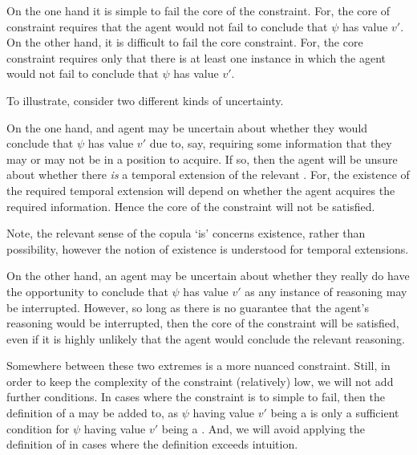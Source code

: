 \begin{note}[Delicacy]
  On the one hand it is simple to fail the core of the constraint.
  For, the core of constraint requires that the agent would not fail to conclude that \(\psi\) has value \(v'\).
  On the other hand, it is difficult to fail the core constraint.
  For, the core constraint requires only that there is at least one instance in which the agent would not fail to conclude that \(\psi\) has value \(v'\).

  To illustrate, consider two different kinds of uncertainty.

  On the one hand, and agent may be uncertain about whether they would conclude that \(\psi\) has value \(v'\) due to, say, requiring some information that they may or may not be in a position to acquire.
  If so, then the agent will be unsure about whether there \emph{is} a temporal extension of the relevant \world{}.
  For, the existence of the required temporal extension will depend on whether the agent acquires the required information.
  Hence the core of the constraint will not be satisfied.

  Note, the relevant sense of the copula `is' concerns existence, rather than possibility, however the notion of existence is understood for temporal extensions.

  On the other hand, an agent may be uncertain about whether they really do have the opportunity to conclude that \(\psi\) has value \(v'\) as any instance of reasoning may be interrupted.
  However, so long as there is no guarantee that the agent's reasoning would be interrupted, then the core of the constraint will be satisfied, even if it is highly unlikely that the agent would conclude the relevant reasoning.

  Somewhere between these two extremes is a more nuanced constraint.
  Still, in order to keep the complexity of the constraint (relatively) low, we will not add further conditions.
  In cases where the constraint is to simple to fail, then the definition of a \requ{} may be added to, as \(\psi\) having value \(v'\) being a \prequ{} is only a sufficient condition for \(\psi\) having value \(v'\) being a \requ{}.
  And, we will avoid applying the definition of \prequ{} in cases where the definition exceeds intuition.
\end{note}


